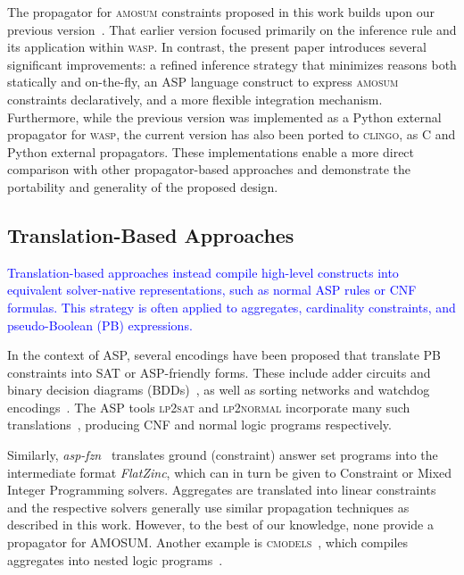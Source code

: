 \documentclass[preprint,authoryear]{elsarticle}
\theoremstyle{definition}
\begin{document}
The propagator for \textsc{amosum} constraints proposed in this work builds upon our previous version~\citep{DBLP:conf/ijcai/AlvianoDFM24}.
That earlier version focused primarily on the inference rule and its application within \textsc{wasp}. 
In contrast, the present paper introduces several significant improvements: 
a refined inference strategy that minimizes reasons both statically and on-the-fly, an ASP language construct to express \textsc{amosum} constraints declaratively, and a more flexible integration mechanism. 
Furthermore, while the previous version was implemented as a Python external propagator for \textsc{wasp}, the current version has also been ported to \textsc{clingo}, as C and Python external propagators.
These implementations enable a more direct comparison with other propagator-based approaches and demonstrate the portability and generality of the proposed design.


\subsection{Translation-Based Approaches}
\textcolor{blue}{Translation-based approaches instead compile high-level constructs into equivalent solver-native representations, such as normal ASP rules or CNF formulas. 
This strategy is often applied to aggregates, cardinality constraints, and pseudo-Boolean (PB) expressions.}

In the context of ASP, several encodings have been proposed that translate PB constraints into SAT or ASP-friendly forms.
These include adder circuits and binary decision diagrams (BDDs)~\citep{DBLP:journals/jair/AbioNORM12,DBLP:journals/jsat/EenS06}, as well as sorting networks and watchdog encodings~\citep{DBLP:conf/sat/BailleuxBR09}. 
The ASP tools \textsc{lp2sat} and \textsc{lp2normal} incorporate many such translations~\citep{DBLP:conf/jelia/BomansonGJ14,DBLP:conf/lpnmr/BomansonJ13}, producing CNF and normal logic programs respectively. 

Similarly, \emph{asp-fzn}~\citep{DBLP:journals/tplp/EiterGMOK25} translates ground (constraint) answer set programs into the intermediate format \emph{FlatZinc}, which can in turn be given to Constraint or Mixed Integer Programming solvers. Aggregates are translated into linear constraints and the respective solvers generally use similar propagation techniques as described in this work. However, to the best of our knowledge, none provide a propagator for \textsc{AMOSUM}.
Another example is \textsc{cmodels}~\citep{DBLP:journals/jar/GiunchigliaLM06}, which compiles aggregates into nested logic programs~\citep{DBLP:journals/tplp/FerrarisL05}.
\end{document}
